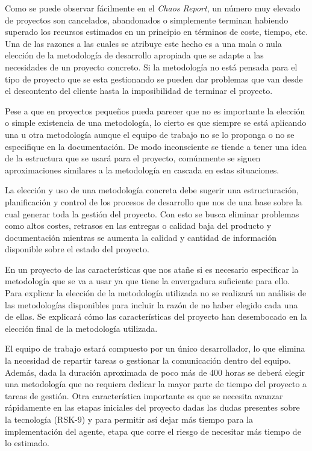 Como se puede observar fácilmente en el \textit{Chaos Report}\cite{chaos}, un número muy elevado de proyectos son cancelados, abandonados o simplemente terminan habiendo superado los recursos estimados en un principio en términos de coste, tiempo, etc. Una de las razones a las cuales se atribuye este hecho es a una mala o nula elección de la metodología de desarrollo apropiada que se adapte a las necesidades de un proyecto concreto. Si la metodología no está pensada para el tipo de proyecto que se esta gestionando se pueden dar problemas que van desde el descontento del cliente hasta la imposibilidad de terminar el proyecto.

\bigskip

Pese a que en proyectos pequeños pueda parecer que no es importante la elección o simple existencia de una metodología, lo cierto es que siempre se está aplicando una u otra metodología aunque el equipo de trabajo no se lo proponga o no se especifique en la documentación. De modo inconsciente se tiende a tener una idea de la estructura que se usará para el proyecto, comúnmente se siguen aproximaciones similares a la metodología en cascada en estas situaciones.

\bigskip

La elección y uso de una metodología concreta debe sugerir una estructuración, planificación y control de los procesos de desarrollo que nos de una base sobre la cual generar toda la gestión del proyecto. Con esto se busca eliminar problemas como altos costes, retrasos en las entregas o calidad baja del producto y documentación mientras se aumenta la calidad y cantidad de información disponible sobre el estado del proyecto.

\bigskip

En un proyecto de las características que nos atañe si es necesario especificar la metodología que se va a usar ya que tiene la envergadura suficiente para ello. Para explicar la elección de la metodología utilizada no se realizará un análisis de las metodologías disponibles para incluir la razón de no haber elegido cada una de ellas. Se explicará cómo las características del proyecto han desembocado en la elección final de la metodología utilizada.

\bigskip

El equipo de trabajo estará compuesto por un único desarrollador, lo que elimina la necesidad de repartir tareas o gestionar la comunicación dentro del equipo. Además, dada la duración aproximada de poco más de 400 horas se deberá elegir una metodología que no requiera dedicar la mayor parte de tiempo del proyecto a tareas de gestión. Otra característica importante es que se necesita avanzar rápidamente en las etapas iniciales del proyecto dadas las dudas presentes sobre la tecnología (RSK-9) y para permitir así dejar más tiempo para la implementación del agente, etapa que corre el riesgo de necesitar más tiempo de lo estimado.


